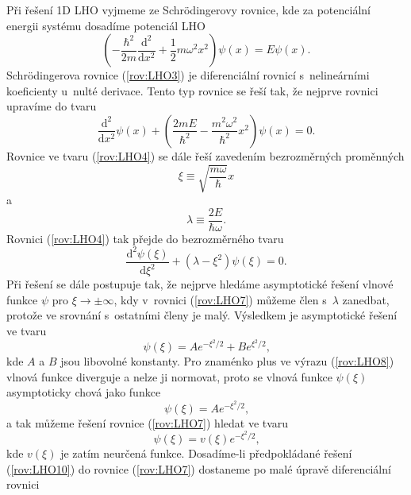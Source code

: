 Při řešení 1D LHO vyjmeme ze Schrödingerovy rovnice, kde za potenciální energii systému dosadíme potenciál LHO
\begin{equation}
\left( -\frac{\hbar^2}{2m}\frac{\mathrm{d}^2}{\mathrm{d}x^2} + \frac{1}{2}m\omega^2x^2 \right) \psi(x) = E\psi(x) \mbox{.}
\label{rov:LHO3}
\end{equation}
Schrödingerova rovnice (\ref{rov:LHO3}) je diferenciální rovnicí s~nelineárními koeficienty u~nulté derivace. Tento typ rovnice se řeší tak, že nejprve rovnici upravíme do tvaru
\begin{equation}
\frac{\mathrm{d}^2}{\mathrm{d}x^2} \psi(x) + \left( \frac{2mE}{\hbar^2} - \frac{m^2\omega^2}{\hbar^2} x^2 \right) \psi(x) = 0 \mbox{.}
\label{rov:LHO4}
\end{equation}
Rovnice ve tvaru (\ref{rov:LHO4}) se dále řeší zavedením bezrozměrných proměnných
\begin{equation}
\xi \equiv \sqrt{\frac{m \omega}{\hbar}} x
\label{rov:LHO5}
\end{equation}
a
\begin{equation}
\lambda \equiv \frac{2E}{\hbar \omega} \mbox{.}
\label{rov:LHO6}
\end{equation}
Rovnici (\ref{rov:LHO4}) tak přejde do bezrozměrného tvaru
\begin{equation}
\frac{\mathrm{d}^2 \psi(\xi)}{\mathrm{d}\xi^2} + (\lambda - \xi^2)\psi(\xi) = 0 \mbox{.}
\label{rov:LHO7}
\end{equation}
Při řešení se dále postupuje tak, že nejprve hledáme asymptotické řešení vlnové funkce $\psi$ pro $\xi \rightarrow \pm \infty$, kdy v~rovnici (\ref{rov:LHO7}) můžeme člen s~$\lambda$ zanedbat, protože ve srovnání s~ostatními členy je malý.  Výsledkem je asymptotické řešení ve tvaru
\begin{equation}
\psi(\xi) = A e^{-\xi^2/2} + B e^{\xi^2/2} \mbox{,}
\label{rov:LHO8}
\end{equation}
kde $A$ a $B$ jsou libovolné konstanty. Pro znaménko plus ve výrazu (\ref{rov:LHO8}) vlnová funkce diverguje a nelze ji normovat, proto se vlnová funkce $\psi(\xi)$ asymptoticky chová jako funkce
\begin{equation}
\psi(\xi) = A e^{-\xi^2/2} \mbox{,}
\label{rov:LHO9}
\end{equation}
a tak můžeme řešení rovnice (\ref{rov:LHO7}) hledat ve tvaru
\begin{equation}
\psi(\xi) = v(\xi)e^{-\xi^2/2} \mbox{,}
\label{rov:LHO10}
\end{equation}
kde $v(\xi)$ je zatím neurčená funkce. Dosadíme-li předpokládané řešení (\ref{rov:LHO10}) do rovnice (\ref{rov:LHO7}) dostaneme po malé úpravě diferenciální rovnici
